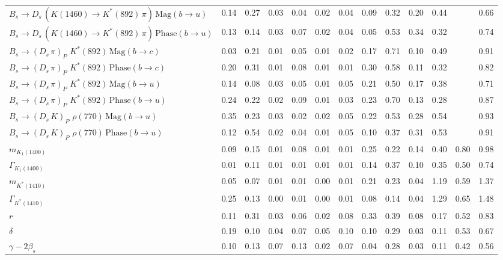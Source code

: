 \begin{tabular}{l  c  c  c  c  c  c  c  c  c  c  c  | c }
$B_s \to D_s \, ( K(1460) \to K^{*}(892) \, \pi ) \, \text{Mag} (b \to u)$ & 0.14 & 0.27 & 0.03 & 0.04 & 0.02 & 0.04 & 0.09 & 0.32 & 0.20 & 0.44 &  & 0.66 \\ 
$B_s \to D_s \, ( K(1460) \to K^{*}(892) \, \pi ) \, \text{Phase} (b \to u)$ & 0.13 & 0.14 & 0.03 & 0.07 & 0.02 & 0.04 & 0.05 & 0.53 & 0.34 & 0.32 &  & 0.74 \\ 
$B_s \to ( D_s \, \pi)_{P} \, \, K^{*}(892) \, \text{Mag} (b \to c)$ & 0.03 & 0.21 & 0.01 & 0.05 & 0.01 & 0.02 & 0.17 & 0.71 & 0.10 & 0.49 &  & 0.91 \\ 
$B_s \to ( D_s \, \pi)_{P} \, \, K^{*}(892) \, \text{Phase} (b \to c)$ & 0.20 & 0.31 & 0.01 & 0.08 & 0.01 & 0.01 & 0.30 & 0.58 & 0.11 & 0.32 &  & 0.82 \\ 
$B_s \to ( D_s \, \pi)_{P} \, \, K^{*}(892) \, \text{Mag} (b \to u)$ & 0.14 & 0.08 & 0.03 & 0.05 & 0.01 & 0.05 & 0.21 & 0.50 & 0.17 & 0.38 &  & 0.71 \\ 
$B_s \to ( D_s \, \pi)_{P} \, \, K^{*}(892) \, \text{Phase} (b \to u)$ & 0.24 & 0.22 & 0.02 & 0.09 & 0.01 & 0.03 & 0.23 & 0.70 & 0.13 & 0.28 &  & 0.87 \\ 
$B_s \to ( D_s \, K)_{P} \, \, \rho(770) \, \text{Mag} (b \to u)$ & 0.35 & 0.23 & 0.03 & 0.02 & 0.02 & 0.05 & 0.22 & 0.53 & 0.28 & 0.54 &  & 0.93 \\ 
$B_s \to ( D_s \, K)_{P} \, \, \rho(770) \, \text{Phase} (b \to u)$ & 0.12 & 0.54 & 0.02 & 0.04 & 0.01 & 0.05 & 0.10 & 0.37 & 0.31 & 0.53 &  & 0.91 \\ 
$m_{K_1(1400)} $ & 0.09 & 0.15 & 0.01 & 0.08 & 0.01 & 0.01 & 0.25 & 0.22 & 0.14 & 0.40 & 0.80 & 0.98 \\ 
$\Gamma_{K_1(1400)}$ & 0.01 & 0.11 & 0.01 & 0.01 & 0.01 & 0.01 & 0.14 & 0.37 & 0.10 & 0.35 & 0.50 & 0.74 \\ 
$m_{K^{*}(1410)}$ & 0.05 & 0.07 & 0.01 & 0.01 & 0.00 & 0.01 & 0.21 & 0.23 & 0.04 & 1.19 & 0.59 & 1.37 \\ 
$\Gamma_{K^{*}(1410)}$ & 0.25 & 0.13 & 0.00 & 0.01 & 0.00 & 0.01 & 0.08 & 0.14 & 0.04 & 1.29 & 0.65 & 1.48 \\ 
$r$ & 0.11 & 0.31 & 0.03 & 0.06 & 0.02 & 0.08 & 0.33 & 0.39 & 0.08 & 0.17 & 0.52 & 0.83 \\ 
$\delta$ & 0.19 & 0.10 & 0.04 & 0.07 & 0.05 & 0.10 & 0.10 & 0.29 & 0.03 & 0.11 & 0.53 & 0.67 \\ 
$\gamma - 2 \beta_{s}$ & 0.10 & 0.13 & 0.07 & 0.13 & 0.02 & 0.07 & 0.04 & 0.28 & 0.03 & 0.11 & 0.42 & 0.56 \\ 
\hline
\hline
\end{tabular}
